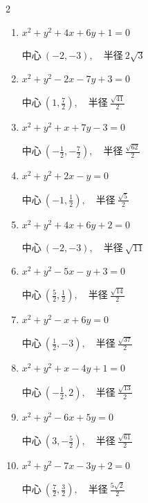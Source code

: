 \begin{multicols}{2}
\begin{enumerate}
        $\displaystyle 中心\: \left(-\frac{5}{2},-\frac{1}{2}\right), \quad 半径 \ \frac{\sqrt{30}}{2}$

  \item $x^{2}+y^{2}+4x+6y+1=0$

        $\displaystyle 中心\: \left(-2,-3\right), \quad 半径 \ 2\sqrt{3}$

\columnbreak %

\resetques

  \item $x^{2}+y^{2}-2x-7y+3=0$

        $\displaystyle 中心\: \left(1,\frac{7}{2}\right), \quad 半径 \ \frac{\sqrt{41}}{2}$

  \item $x^{2}+y^{2}+x+7y-3=0$

        $\displaystyle 中心\: \left(-\frac{1}{2},-\frac{7}{2}\right), \quad 半径 \ \frac{\sqrt{62}}{2}$

  \item $x^{2}+y^{2}+2x-y=0$

        $\displaystyle 中心\: \left(-1,\frac{1}{2}\right), \quad 半径 \ \frac{\sqrt{5}}{2}$

  \item $x^{2}+y^{2}+4x+6y+2=0$

        $\displaystyle 中心\: \left(-2,-3\right), \quad 半径 \ \sqrt{11}$

  \item $x^{2}+y^{2}-5x-y+3=0$

        $\displaystyle 中心\: \left(\frac{5}{2},\frac{1}{2}\right), \quad 半径 \ \frac{\sqrt{14}}{2}$

  \item $x^{2}+y^{2}-x+6y=0$

        $\displaystyle 中心\: \left(\frac{1}{2},-3\right), \quad 半径 \ \frac{\sqrt{37}}{2}$

  \item $x^{2}+y^{2}+x-4y+1=0$

        $\displaystyle 中心\: \left(-\frac{1}{2},2\right), \quad 半径 \ \frac{\sqrt{13}}{2}$

  \item $x^{2}+y^{2}-6x+5y=0$

        $\displaystyle 中心\: \left(3,-\frac{5}{2}\right), \quad 半径 \ \frac{\sqrt{61}}{2}$

  \item $x^{2}+y^{2}-7x-3y+2=0$

        $\displaystyle 中心\: \left(\frac{7}{2},\frac{3}{2}\right), \quad 半径 \ \frac{5\sqrt{2}}{2}$


\end{enumerate}
\end{multicols}
